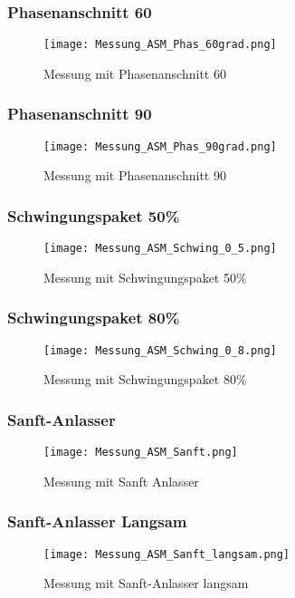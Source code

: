 \subsubsection*{Phasenanschnitt 60\textdegree}
\begin{figure}[ht!]
	\centering
	\texttt{[image: Messung\_ASM\_Phas\_60grad.png]}	
	\caption{Messung mit Phasenanschnitt 60\textdegree}\label{fig:Mess_ASM_Phas60}
\end{figure}

\newpage
\subsubsection*{Phasenanschnitt 90\textdegree}
\begin{figure}[ht!]
	\centering
	\texttt{[image: Messung\_ASM\_Phas\_90grad.png]}	
	\caption{Messung mit Phasenanschnitt 90\textdegree}\label{fig:Mess_ASM_Phas90}
\end{figure}

\newpage
\subsubsection*{Schwingungspaket 50\%}
\begin{figure}[ht!]
	\centering
	\texttt{[image: Messung\_ASM\_Schwing\_0\_5.png]}	
	\caption{Messung mit Schwingungspaket 50\%}\label{fig:Mess_ASM_Schwing_0_5}
\end{figure}

\newpage
\subsubsection*{Schwingungspaket 80\%}
\begin{figure}[ht!]
	\centering
	\texttt{[image: Messung\_ASM\_Schwing\_0\_8.png]}	
	\caption{Messung mit Schwingungspaket 80\%}\label{fig:Mess_ASM_Schwing_0_8}
\end{figure}

\newpage
\subsubsection*{Sanft-Anlasser}
\begin{figure}[ht!]
	\centering
	\texttt{[image: Messung\_ASM\_Sanft.png]}	
	\caption{Messung mit Sanft Anlasser}\label{fig:Mess_ASM_Sanft}
\end{figure}

\newpage
\subsubsection*{Sanft-Anlasser Langsam}
\begin{figure}[ht!]
	\centering
	\texttt{[image: Messung\_ASM\_Sanft\_langsam.png]}	
	\caption{Messung mit Sanft-Anlasser langsam}\label{fig:Mess_ASM_Sanft_langsam}
\end{figure}

